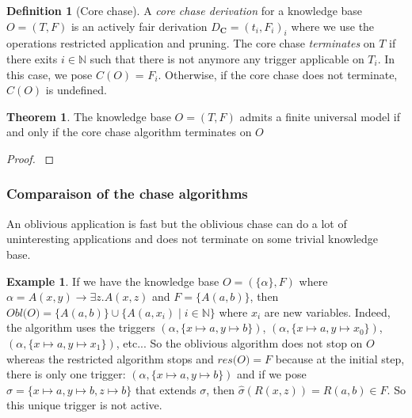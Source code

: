 \documentclass{article}
\theoremstyle{definition}
\newtheorem{definition}{Definition}[section]
\newtheorem{theorem}{Theorem}[section]
\newtheorem{example}{Example}[section]
\theoremstyle{remark}
\def \N {\mathbb N}
\begin{document}
\begin{definition}[Core chase]
A \emph{core chase derivation} for a knowledge base $O = (T,F)$ is an actively fair derivation $D_{\textbf{C}} = (t_i,F_i)_{i}$ where we  use the operations restricted application and pruning. The core chase \emph{terminates} on $T$ if there exits $i \in \N$ such that there is not anymore any trigger applicable on $T_i$. In this case, we pose \emph{$\textit{C}(O)$} = $F_i$. Otherwise, if the core chase does not terminate,$\textit{C}(O)$ is undefined.
\end{definition} 

\begin{theorem}
The knowledge base $O = (T,F)$ admits a finite universal model if and only if the core chase algorithm terminates on $O$
\end{theorem}

\begin{proof}
\cite{core_chase}
\end{proof}

\subsubsection{Comparaison of the chase algorithms}

An oblivious application is fast but the oblivious chase  can do a lot of uninteresting applications and does not terminate on some trivial knowledge base. 
\begin{example}
If we have the knowledge base $O=(\{\alpha\},F)$ where $\alpha = A(x,y) \rightarrow \exists z.A(x,z)$ and $F =  \{A(a,b)\}$, then $\textit{Obl(O)}= \{A(a,b)\}\cup\{A(a,x_i) \mid i \in \N\}$ where $x_i$ are new variables. Indeed, the algorithm uses the triggers $(\alpha, \{x \mapsto a, y \mapsto b\})$, $(\alpha, \{x \mapsto a, y \mapsto x_0\})$,$(\alpha, \{x \mapsto a, y \mapsto x_1\})$, etc...
So the oblivious algorithm does not stop on $O$ whereas the restricted algorithm stops and $\textit{res(O)} = F$ because at the initial step, there is only one trigger: $(\alpha, \{x \mapsto a, y \mapsto b\})$ and if we pose $\hat \sigma = \{x \mapsto a, y \mapsto b, z \mapsto b\}$ that extends $\sigma$, then $\hat \sigma(R(x,z))=R(a,b) \in F$. So this unique trigger is not active.
\end{example}
\end{document}
